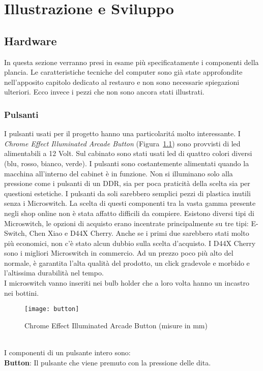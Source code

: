 \chapter{Illustrazione e Sviluppo}
\section{Hardware}
In questa sezione verranno presi in esame più specificatamente i componenti della plancia. Le caratteristiche tecniche del computer sono già state approfondite nell’apposito capitolo dedicato al restauro e non sono necessarie spiegazioni ulteriori. Ecco invece i pezzi che non sono ancora stati illustrati.
\subsection{Pulsanti}
I pulsanti usati per il progetto hanno una particolaritá molto interessante. I \textit{Chrome Effect Illuminated Arcade Button} (Figura~\ref{fig:button}) sono provvisti di led alimentabili a 12 Volt. Sul cabinato sono stati usati led di quattro colori diversi (blu, rosso, bianco, verde). I pulsanti sono costantemente alimentati quando la macchina all'interno del cabinet è in funzione. Non si illuminano solo alla pressione come i pulsanti di un DDR, sia per poca praticità della scelta sia per questioni estetiche. I pulsanti da soli sarebbero semplici pezzi di plastica inutili senza i Microswitch. La scelta di questi componenti tra la vasta gamma presente negli shop online non è stata affatto difficili da compiere. Esistono diversi tipi di Microswitch, le opzioni di acquisto erano incentrate principalmente su tre tipi: E-Switch, Chen Xiao e D44X Cherry. Anche se i primi due sarebbero stati molto più economici, non c’è stato alcun dubbio sulla scelta d’acquisto. I D44X Cherry sono i migliori Microswitch in commercio. Ad un prezzo poco più alto del normale, è garantita l’alta qualità del prodotto, un click gradevole e morbido e l’altissima durabilità nel tempo.\\I microswitch vanno inseriti nei bulb holder che a loro volta hanno un incastro nei bottini.\\
\begin{figure}[!ht]
\texttt{[image: button]}
\centering
\caption{Chrome Effect Illuminated Arcade Button (misure in mm)}
\label{fig:button}
\end{figure}
\\I componenti di un pulsante intero sono:\\
\textbf{Button}: Il pulsante che viene premuto con la pressione delle dita.\\
